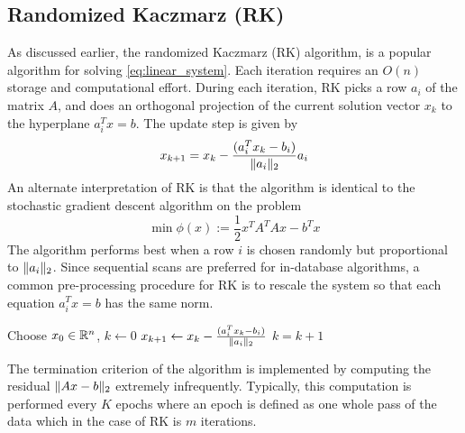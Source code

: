 \subsection{Randomized Kaczmarz (RK)}
As discussed earlier, the randomized Kaczmarz (RK) algorithm, is a popular
algorithm for solving \eqref{eq:linear_system}. Each iteration requires an
$O(n)$ storage and computational effort. During each iteration, RK picks a
row $a_i$ of the matrix $A$, and does an orthogonal projection of the current
solution vector $x_k$ to the hyperplane $a_i^Tx = b$. The update step is given by
$$
x_{k+1} = x_k - \frac{(a_i^T x_k - b_i)}{\| a_i \|_2} a_i
$$
An alternate interpretation of RK is that the algorithm is identical to the
stochastic gradient  descent algorithm on the problem
$$
  \min \phi(x) := \frac{1}{2} x^T A^T A x - b^T x
$$
The algorithm performs best when a row $i$ is chosen randomly but proportional
to $\| a_i \|_2$. Since sequential scans are preferred for in-database algorithms,
a common pre-processing procedure for RK is to rescale the system so that each
equation $a_i^Tx = b$ has the same norm.

\begin{algorithm}%
\begin{algorithmic}[1]
\State Choose $x_0 \in \mathbb{R}^n$, $k \leftarrow 0$
\State$x_{k+1} \leftarrow x_k - \frac{(a_i^T x_k - b_i)}{\| a_i \|_2}$
  \State$k = k + 1$
\EndWhile
\end{algorithmic}
\label{alg:rk}
\end{algorithm}

The termination criterion of the algorithm is implemented by computing the
residual $\| Ax-b \|_2$ extremely infrequently. Typically, this computation
is performed every $K$ epochs where an epoch is defined as one whole pass of
the data which in the case of RK is $m$ iterations.
